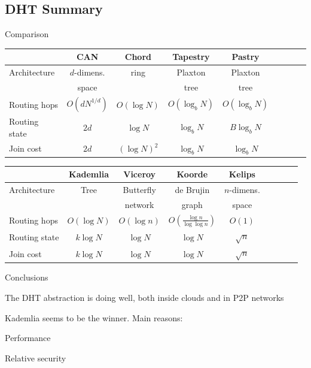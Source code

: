 \subsection{DHT Summary}

\begin{frame}{Comparison}

\begin{table}
\begin{tabular}{|l||c|c|c|c|c|c|c|c|}
\hline
   & \textbf{CAN} & \textbf{Chord} & \textbf{Tapestry} & \textbf{Pastry}  \\
\hline\hline
Architecture & $d$-dimens. & ring & Plaxton & Plaxton \\
             & space           &      & tree    & tree  \\
\hline
Routing hops & $O(dN^{1/d})$ & $O(\log N)$ & $O(\log_b N)$ & $O(\log_b N)$ \\
\hline
Routing state & $2d$ & $\log N$ & $\log_b N$ & $B\log_b N$\\
\hline
Join cost & $2d$ & $(\log N)^2$ & $\log_b N$ & $\log_b N$ \\
\hline
\end{tabular}
\end{table}

\begin{table}
\begin{tabular}{|l||c|c|c|c|c|c|c|c|}
\hline
   & \textbf{Kademlia} & \textbf{Viceroy} & \textbf{Koorde} & \textbf{Kelips} \\
\hline\hline
Architecture & Tree & Butterfly & de Brujin & $n$-dimens. \\
             &      & network   & graph     & space \\
\hline
Routing hops & $O(\log N)$ & $O(\log n)$ & $O\left(\frac{\log n}{\log \log n}\right)$ & $O(1)$ \\
\hline
Routing state & $k\log N$ & $\log N$ & $\log N$ & $\sqrt{n}$ \\
\hline
Join cost & $k \log N$ & $\log N$ & $\log N$ & $\sqrt{n}$ \\
\hline
\end{tabular}
\end{table}

\end{frame}

\begin{frame}{Conclusions}

\BIL
\item The DHT abstraction is doing well, both inside clouds and in 
P2P networks
\item Kademlia seems to be the winner. Main reasons:
\BI
\item Performance
\item Relative security
\EI
\EIL

\end{frame}

